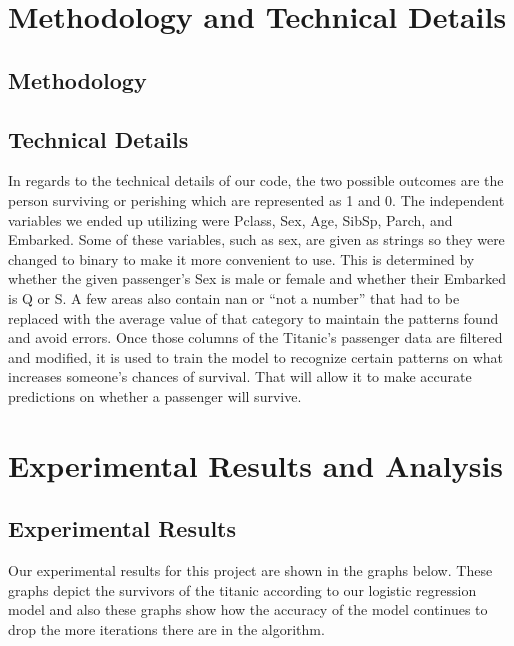 \documentclass{IEEE}
\begin{document}
\section{Methodology and Technical Details}

\subsection{Methodology}

\subsection{Technical Details}
In regards to the technical details of our code, the two possible outcomes are the person surviving or perishing which are represented as 1 and 0. The independent variables we ended up utilizing were Pclass, Sex, Age, SibSp, Parch, and Embarked. Some of these variables, such as sex, are given as strings so they were changed to binary to make it more convenient to use. This is determined by whether the given passenger’s Sex is male or female and whether their Embarked is Q or S. A few areas also contain nan or “not a number” that had to be replaced with the average value of that category to maintain the patterns found and avoid errors. Once those columns of the Titanic’s passenger data are filtered and modified, it is used to train the model to recognize certain patterns on what increases someone’s chances of survival. That will allow it to make accurate predictions on whether a passenger will survive.

\section{Experimental Results and Analysis}

\subsection{Experimental Results}
Our experimental results for this project are shown in the graphs below. These graphs depict the survivors of the titanic according to our logistic regression model and also these graphs show how the accuracy of the model continues to drop the more iterations there are in the algorithm.
\end{document}
